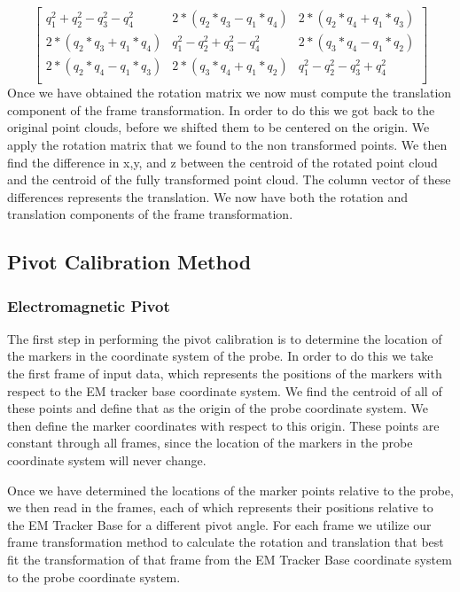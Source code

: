 \documentclass[a4paper]{article}
\begin{document}
\[
\begin{bmatrix}
    q_1^2 + q_2^2 - q_3^2 - q_4^2 & 2*(q_2*q_3 - q_1*q_4) & 2*(q_2*q_4 + q_1*q_3)\\
    2*(q_2*q_3 + q_1*q_4) & q_1^2 - q_2^2 + q_3^2 - q_4^2 & 2*(q_3*q_4 - q_1*q_2)\\
    2*(q_2*q_4 - q_1*q_3) & 2*(q_3*q_4 + q_1*q_2) & q_1^2 - q_2^2 - q_3^2 + q_4^2 \\
\end{bmatrix}
\]
Once we have obtained the rotation matrix we now must compute the translation component of the frame transformation. In order to do this we got back to the original point clouds, before we shifted them to be centered on the origin. We apply the rotation matrix that we found to the non transformed points. We then find the difference in x,y, and z between the centroid of the rotated point cloud and the centroid of the fully transformed point cloud. The column vector of these differences represents the translation. We now have both the rotation and translation components of the frame transformation. 
\subsection{Pivot Calibration Method}
\subsubsection{Electromagnetic Pivot}

The first step in performing the pivot calibration is to determine the location of the markers in the coordinate system of the probe. In order to do this we take the first frame of input data, which represents the positions of the markers with respect to the EM tracker base coordinate system. We find the centroid of all of these points and define that as the origin of the probe coordinate system. We then define the marker coordinates with respect to this origin. These points are constant through all frames, since the location of the markers in the probe coordinate system will never change. 

Once we have determined the locations of the marker points relative to the probe, we then read in the frames, each of which represents their positions relative to the EM Tracker Base for a different pivot angle. For each frame we utilize our frame transformation method to calculate the rotation and translation that best fit the transformation of that frame from the EM Tracker Base coordinate system to the probe coordinate system. 
\end{document}
